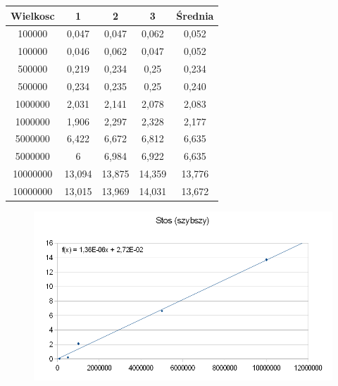\documentclass[12pt,a4paper,titlepage]{article}
\begin{document}
\begin{center}
\begin {tabular}{|c|c|c|c|c|}\hline
Wielkosc & 1 & 2 & 3 & Średnia \\\hline
100000&0,047&0,047&0,062&0,052 \\\hline
100000&0,046&0,062&0,047&0,052 \\\hline
500000&0,219&0,234&0,25&0,234 \\\hline
500000&0,234&0,235&0,25&0,240 \\\hline
1000000&2,031&2,141&2,078&2,083 \\\hline
1000000&1,906&2,297&2,328&2,177 \\\hline
5000000&6,422&6,672&6,812&6,635 \\\hline
5000000&6&6,984&6,922&6,635 \\\hline
10000000&13,094&13,875&14,359&13,776 \\\hline
10000000&13,015&13,969&14,031&13,672 \\\hline
\end{tabular}
\end {center}
\begin{figure}[h]
\begin{center}
\includegraphics[scale=0.5]{stos_2.png}
\end{center}
\end{figure}

\newpage
\end{document}
